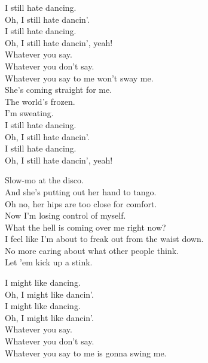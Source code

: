 


I still hate dancing. \\
Oh, I still hate dancin'. \\
I still hate dancing. \\
Oh, I still hate dancin', yeah! \\

Whatever you say. \\
Whatever you don't say. \\
Whatever you say to me won't sway me. \\

She's coming straight for me. \\
The world's frozen. \\
I'm sweating. \\

I still hate dancing. \\
Oh, I still hate dancin'. \\
I still hate dancing. \\
Oh, I still hate dancin', yeah! \\


Slow-mo at the disco. \\
And she's putting out her hand to tango. \\
Oh no, her hips are too close for comfort. \\
Now I'm losing control of myself. \\

What the hell is coming over me right now? \\
I feel like I'm about to freak out from the waist down. \\
No more caring about what other people think. \\
Let 'em kick up a stink. \\


I might like dancing. \\
Oh, I might like dancin'. \\
I might like dancing. \\
Oh, I might like dancin'. \\

Whatever you say. \\
Whatever you don't say. \\
Whatever you say to me is gonna swing me. \\

